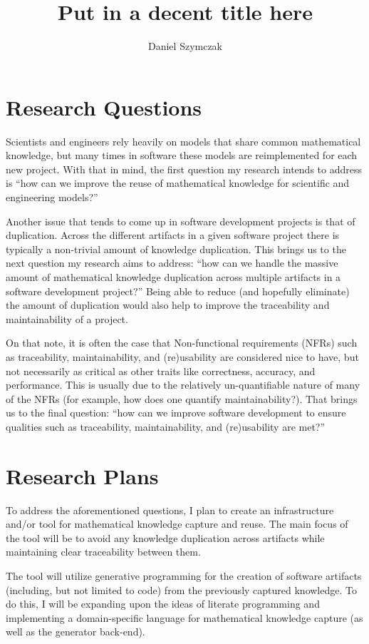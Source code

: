 \documentclass[11pt]{article} %
\title{Put in a decent title here}
\author{Daniel Szymczak}
\begin{document}
\maketitle

\section{Research Questions}

Scientists and engineers rely heavily on models that share common mathematical
knowledge, but many times in software these models are reimplemented for each
new project. With that in mind, the first question my research intends to
address is ``how can we improve the reuse of mathematical knowledge for
scientific and engineering models?''

Another issue that tends to come up in software development projects is that of
duplication. Across the different artifacts in a given software project
there is typically a non-trivial amount of knowledge duplication. This brings us
to the next question my research aims to address: ``how can we handle the 
massive amount of mathematical knowledge duplication across multiple artifacts
in a software development project?'' Being able to reduce (and hopefully
eliminate) the amount of duplication would also help to improve the traceability
and maintainability of a project.

On that note, it is often the case that Non-functional requirements (NFRs) such
as traceability, maintainability, and (re)usability are considered nice to have,
but not necessarily as critical as other traits like correctness, accuracy, and
performance. This is usually due to the relatively un-quantifiable nature of 
many of the NFRs (for example, how does one quantify maintainability?). That 
brings us to the final question: ``how can we improve software development to
ensure qualities such as traceability, maintainability, and (re)usability are
met?''

\section{Research Plans}

To address the aforementioned questions, I plan to create an 
infrastructure and/or tool for mathematical knowledge capture and reuse. The 
main focus of the tool will be to avoid any knowledge duplication across
artifacts while maintaining clear traceability between them.

The tool will utilize generative programming for the creation of software
artifacts (including, but not limited to code) from the previously captured
knowledge. To do this, I will be expanding upon the ideas of literate
programming and implementing a domain-specific language for mathematical
knowledge capture (as well as the generator back-end).
\end{document}
